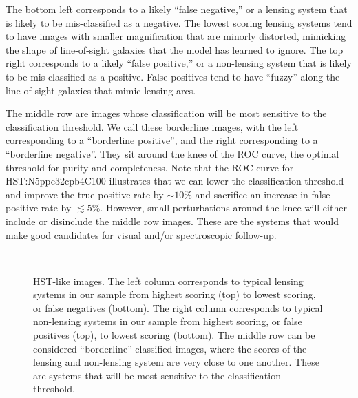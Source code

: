 \documentclass{emulateapj}
\def\lsim{\lesssim}
\begin{document}
The bottom left corresponds to a likely ``false negative,'' or a
lensing system that is likely to be mis-classified as a negative.  The
lowest scoring lensing systems tend to have images with smaller
magnification that are minorly distorted, mimicking the shape of
line-of-sight galaxies that the model has learned to ignore.  The top
right corresponds to a likely ``false positive,'' or a non-lensing
system that is likely to be mis-classified as a positive.  False
positives tend to have ``fuzzy'' along the line of sight galaxies that
mimic lensing arcs.

The middle row are images whose classification will be most sensitive
to the classification threshold.  We call these borderline images,
with the left corresponding to a ``borderline positive'', and the
right corresponding to a ``borderline negative''.  They sit around the
knee of the ROC curve, the optimal threshold for purity and
completeness.  Note that the ROC curve for HST:N5ppc32cpb4C100
illustrates that we can lower the classification threshold and improve
the true positive rate by $\sim10\%$ and sacrifice an increase in
false positive rate by $\lsim5\%$.  However, small perturbations
around the knee will either include or disinclude the middle row
images.  These are the systems that would make good candidates for
visual and/or spectroscopic follow-up.

\begin{figure*}[t]
  \centering \mbox{
    \hfill
     } \mbox{
    \hfill
     } \mbox{
    \hfill
     }
\caption{HST-like images. The left column corresponds to typical
  lensing systems in our sample from highest scoring (top) to lowest
  scoring, or false negatives (bottom).  The right column corresponds
  to typical non-lensing systems in our sample from highest scoring,
  or false positives (top), to lowest scoring (bottom).  The middle
  row can be considered ``borderline'' classified images, where the
  scores of the lensing and non-lensing system are very close to one
  another.  These are systems that will be most sensitive to the
  classification threshold.}
\label{fig:HSTclassificationtile}
\end{figure*}
\end{document}
